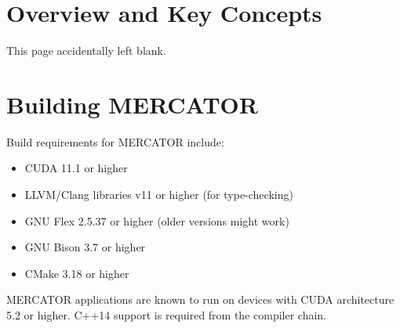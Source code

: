 \documentclass[11pt]{article}
\begin{document}
\newpage

\section{Overview and Key Concepts}

This page accidentally left blank.
\newpage

\section{Building MERCATOR}

Build requirements for MERCATOR include:
\begin{itemize}

\item CUDA 11.1 or higher

\item LLVM/Clang libraries v11 or higher (for type-checking)

\item GNU Flex 2.5.37 or higher (older versions might work)

\item GNU Bison 3.7 or higher

\item CMake 3.18 or higher

\end{itemize}
MERCATOR applications are known to run on devices with CUDA
architecture 5.2 or higher.  C++14 support is required from the
compiler chain.
\end{document}
